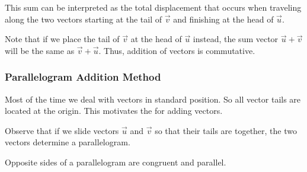 \documentclass{ximera}
\begin{document}
This sum can be interpreted as the total displacement that occurs when traveling along the two vectors starting at the tail of $\vec{v}$ and finishing at the head of $\vec{u}$.

Note that if we place the tail of $\vec{v}$ at the head of $\vec{u}$ instead, the sum vector $\vec{u}+\vec{v}$ will be the same as $\vec{v}+\vec{u}$.  Thus, addition of vectors is commutative.
\subsubsection*{Parallelogram Addition Method}
Most of the time we deal with vectors in standard position.  So all vector tails are located at the origin.  This motivates the  for adding vectors.  

Observe that if we slide vectors $\vec{u}$ and $\vec{v}$ so that their tails are together, the two vectors determine a parallelogram.  

\begin{image}[2.5in]
\end{image}

Opposite sides of a parallelogram are congruent and parallel.

\begin{image}[2.5in]
\end{image}
\end{document}
